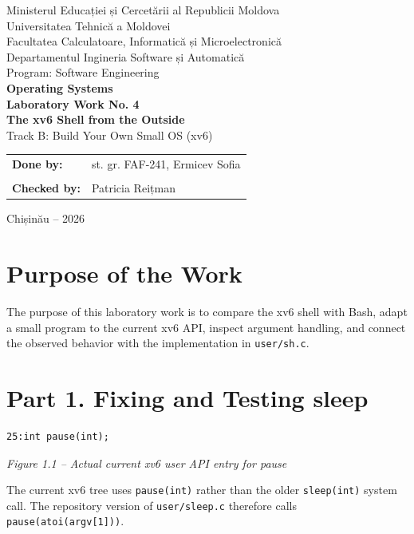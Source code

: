 \documentclass[12pt,a4paper]{article}
\newcommand{\figcap}[1]{\begin{center}\small\textit{#1}\end{center}\vspace{0.4em}}
\begin{document}
\begin{titlepage}
\begin{center}
{\large Ministerul Educației și Cercetării al Republicii Moldova}\\[0.3cm]
{\large Universitatea Tehnică a Moldovei}\\[0.3cm]
{\large Facultatea Calculatoare, Informatică și Microelectronică}\\[0.3cm]
{\large Departamentul Ingineria Software și Automatică}\\[0.3cm]
{\large Program: Software Engineering}\\[2.0cm]
{\Large \textbf{Operating Systems}}\\[0.8cm]
{\LARGE \textbf{Laboratory Work No. 4}}\\[0.5cm]
{\Large \textbf{The xv6 Shell from the Outside}}\\[0.35cm]
{\large Track B: Build Your Own Small OS (xv6)}
\vfill
\begin{flushright}
\begin{tabular}{ll}
\textbf{Done by:} & st. gr. FAF-241, Ermicev Sofia \\
\\
\textbf{Checked by:} & Patricia Reițman
\end{tabular}
\end{flushright}
\vfill
{\large Chișinău -- 2026}
\end{center}
\end{titlepage}
\tableofcontents
\newpage

\section{Purpose of the Work}
The purpose of this laboratory work is to compare the xv6 shell with Bash, adapt a small program to the current xv6 API, inspect argument handling, and connect the observed behavior with the implementation in \texttt{user/sh.c}.

\section{Part 1. Fixing and Testing sleep}
\begin{lstlisting}
25:int pause(int);
\end{lstlisting}
\figcap{Figure 1.1 -- Actual current xv6 user API entry for pause}

The current xv6 tree uses \texttt{pause(int)} rather than the older \texttt{sleep(int)} system call. The repository version of \texttt{user/sleep.c} therefore calls \texttt{pause(atoi(argv[1]))}.
\end{document}
